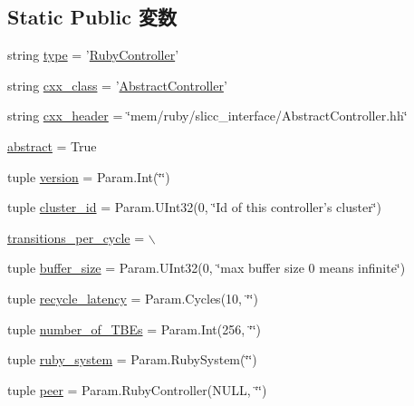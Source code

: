 \subsection*{Static Public 変数}
\begin{DoxyCompactItemize}
\item 
string \hyperlink{classController_1_1RubyController_acce15679d830831b0bbe8ebc2a60b2ca}{type} = '\hyperlink{classController_1_1RubyController}{RubyController}'
\item 
string \hyperlink{classController_1_1RubyController_a58cd55cd4023648e138237cfc0822ae3}{cxx\_\-class} = '\hyperlink{classAbstractController}{AbstractController}'
\item 
string \hyperlink{classController_1_1RubyController_a17da7064bc5c518791f0c891eff05fda}{cxx\_\-header} = \char`\"{}mem/ruby/slicc\_\-interface/AbstractController.hh\char`\"{}
\item 
\hyperlink{classController_1_1RubyController_a17fa61ac3806b481cafee5593b55e5d0}{abstract} = True
\item 
tuple \hyperlink{classController_1_1RubyController_a76aa01cd80eeb03b381ebe36f17c16b2}{version} = Param.Int(\char`\"{}\char`\"{})
\item 
tuple \hyperlink{classController_1_1RubyController_a6687b3756ef466b810c9d374a2ee6bd6}{cluster\_\-id} = Param.UInt32(0, \char`\"{}Id of this controller's cluster\char`\"{})
\item 
\hyperlink{classController_1_1RubyController_a9ae45e227e24b455fccbde39c5ee0318}{transitions\_\-per\_\-cycle} = $\backslash$
\item 
tuple \hyperlink{classController_1_1RubyController_a0f14097399fa367505d7d06197f1498c}{buffer\_\-size} = Param.UInt32(0, \char`\"{}max buffer size 0 means infinite\char`\"{})
\item 
tuple \hyperlink{classController_1_1RubyController_a2353179b53dc9badeb6d119643454626}{recycle\_\-latency} = Param.Cycles(10, \char`\"{}\char`\"{})
\item 
tuple \hyperlink{classController_1_1RubyController_a6d1f6e8aa75df15fcde7ed16b07e1099}{number\_\-of\_\-TBEs} = Param.Int(256, \char`\"{}\char`\"{})
\item 
tuple \hyperlink{classController_1_1RubyController_ad43d9de73a55aa43ab5023d7815d7286}{ruby\_\-system} = Param.RubySystem(\char`\"{}\char`\"{})
\item 
tuple \hyperlink{classController_1_1RubyController_a8836ce008066373d4694ddc539e7136a}{peer} = Param.RubyController(NULL, \char`\"{}\char`\"{})
\end{DoxyCompactItemize}


